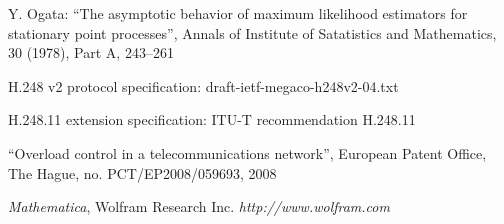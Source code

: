 \documentclass[conference]{IEEEtran}
\newcommand{\comment}[1]{}
\begin{document}
\begin{thebibliography}{1}
Y\comment{osihiko}. Ogata: ``The asymptotic behavior of maximum likelihood estimators for stationary point
processes'', Annals of Institute of Satatistics and Mathematics, 30
(1978), Part A, 243--261

H.248 v2 protocol specification: draft-ietf-megaco-h248v2-04.txt

H.248.11 extension specification: ITU-T recommendation H.248.11

``Overload control in a telecommunications
network'', European Patent Office, The Hague, no. PCT/EP2008/059693,
2008

\comment{\bibitem{MGCMGW}Media Gateway Resource Congestion Handling
Package (H.248.10): ITU-T H.248 Annex M.2}

 \textit{Mathematica}, Wolfram
Research Inc. \textit{http://www.wolfram.com}
\end{thebibliography}
\end{document}
